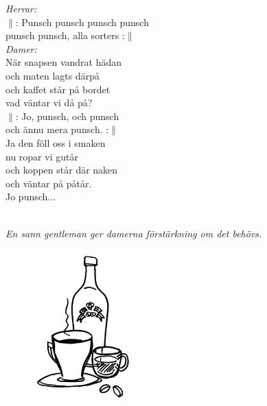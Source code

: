 \documentclass[a6paper,10pt]{article}
\begin{document}
\setlength{\oddsidemargin}{-0.47in}
\noindent
\begin{center}
\end{center}
\begin{lyrics}
\textit{Herrar:}
\vspace{4pt}\\
$\|$: Punsch punsch punsch punsch\\
punsch punsch, alla sorters :$\|$
\vspace{5pt}\\
\textit{Damer:}
\vspace{4pt}\\
När snapsen vandrat hädan\\
och maten lagts därpå\\
och kaffet står på bordet\\
vad väntar vi då på?
\vspace{5pt}\\
$\|$: Jo, punsch, och punsch\\
och ännu mera punsch. :$\|$
\vspace{5pt}\\
Ja den föll oss i smaken \\
nu ropar vi gutår\\
och koppen står där naken\\
och väntar på påtår.
\vspace{5pt}\\
Jo punsch...
\end{lyrics}
\vspace{10pt}\\
\textit{En sann gentleman ger damerna förstärkning om det behövs.}
\begin{figure}[!h]
\centering
\includegraphics[width=0.35\textwidth]{kaffe.jpg}
\end{figure}
\end{document}
